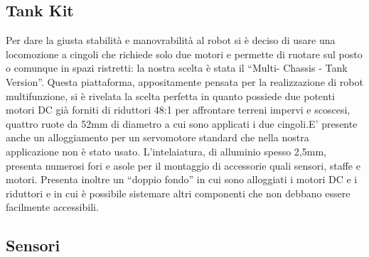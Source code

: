 \subsection {Tank Kit}
Per dare la giusta stabilità e manovrabilità al robot si è deciso di usare una
 locomozione a cingoli che richiede solo due motori e permette di ruotare sul 
 posto o comunque in spazi ristretti: la nostra scelta è stata il ``Multi-
 Chassis - Tank Version''. Questa piattaforma, appositamente pensata per la 
 realizzazione di robot multifunzione, si è rivelata la scelta perfetta in 
 quanto possiede due potenti motori DC già forniti di riduttori 48:1 per 
 affrontare terreni impervi e scoscesi, quattro ruote da 52mm di diametro a 
 cui sono applicati i due cingoli.E' presente anche un alloggiamento per un 
 servomotore standard che nella nostra applicazione non è stato usato. 
 L'intelaiatura, di alluminio spesso 2,5mm, presenta numerosi fori e asole per 
 il montaggio di accessorie quali sensori, staffe e motori. Presenta inoltre 
 un ``doppio fondo'' in cui sono alloggiati i motori DC e i riduttori e in cui 
 è possibile sistemare altri componenti che non debbano essere facilmente 
 accessibili.
\subsection {Sensori}
